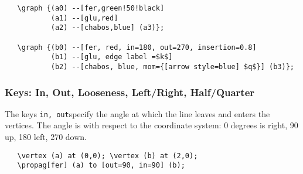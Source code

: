\documentclass[10pt,letterpaper,twoside,notitlepage]{article}
\numberwithin{figure}{section}
\begin{document}
%
\begin{minipage}{0.75\linewidth}
\blucol\begin{verbatim}
   \graph {(a0) --[fer,green!50!black] 
           (a1) --[glu,red] 
           (a2) --[chabos,blue] (a3)};
           
   \graph {(b0) --[fer, red, in=180, out=270, insertion=0.8] 
           (b1) --[glu, edge label =$k$] 
           (b2) --[chabos, blue, mom={[arrow style=blue] $q$}] (b3)};
\end{verbatim}\txcol
\end{minipage}
%
%
\begin{minipage}{0.23\linewidth}
\end{minipage}
%
\newpage\subsubsection{Keys: In, Out, Looseness, Left/Right, Half/Quarter}
\label{sec:_feynmandiagrams_keysinoutetc}
%
\noindent
The keys \vercol\verb$in, out$\txcol specify the angle
at which the line leaves and enters the vertices.
The angle is with respect to the coordinate system:
0 degrees is right, 90 up, 180 left, 270 down.
\vspace{2mm}\\
%
\begin{minipage}{0.7\linewidth}
\vercol\begin{verbatim}
   \vertex (a) at (0,0); \vertex (b) at (2,0);
   \propag[fer] (a) to [out=90, in=90] (b);
\end{verbatim}\txcol
\end{minipage}
%
\begin{minipage}{0.25\linewidth}
\end{minipage}
\end{document}
